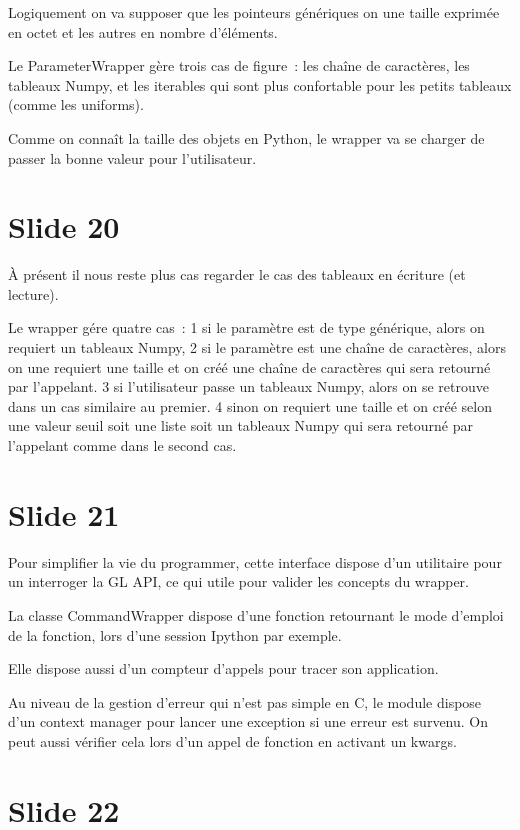 \documentclass[12pt]{article}
\begin{document}
Logiquement on va supposer que les pointeurs génériques on une taille exprimée en octet et les
autres en nombre d'éléments.

Le ParameterWrapper gère trois cas de figure~:
  les chaîne de caractères,
  les tableaux Numpy,
  et les iterables qui sont plus confortable pour les petits tableaux (comme les uniforms).

Comme on connaît la taille des objets en Python, le wrapper va se charger de passer la bonne valeur
pour l'utilisateur.

\section{Slide 20}

À présent il nous reste plus cas regarder le cas des tableaux en écriture (et lecture).

Le wrapper gére quatre cas~:
 1 si le paramètre est de type générique, alors on requiert un tableaux Numpy,
 2 si le paramètre est une chaîne de caractères, alors on une requiert une taille et on créé une
 chaîne de caractères qui sera retourné par l'appelant. 
 3 si l'utilisateur passe un tableaux Numpy, alors on se retrouve dans un cas similaire au premier.
 4 sinon on requiert une taille et on créé selon une valeur seuil soit une liste soit un tableaux
 Numpy qui sera retourné par l'appelant comme dans le second cas.  

\section{Slide 21}

Pour simplifier la vie du programmer,
cette interface dispose d'un utilitaire pour un interroger la GL API, ce qui utile pour valider les
concepts du wrapper.

La classe CommandWrapper dispose d'une fonction retournant le mode d'emploi de la fonction, lors d'une
session Ipython par exemple.

Elle dispose aussi d'un compteur d'appels pour tracer son application.

Au niveau de la gestion d'erreur qui n'est pas simple en C, le module dispose d'un context manager
pour lancer une exception si une erreur est survenu. On peut aussi vérifier cela lors d'un appel de
fonction en activant un kwargs.

\section{Slide 22}
\end{document}
